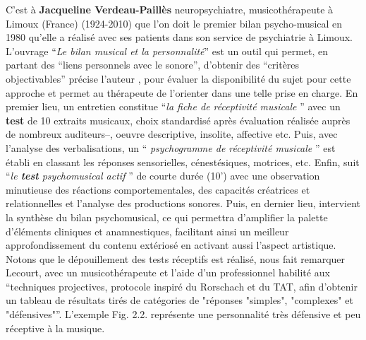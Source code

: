 C'est à \textbf{Jacqueline Verdeau-Paillès} neuropsychiatre,
  musicothérapeute à Limoux (France) (1924-2010) que l'on doit le premier bilan
                     psycho-musical en 1980 qu'elle a réalisé avec ses patients dans son service
                     de psychiatrie à Limoux.
L'ouvrage \enquote {\textit{Le bilan musical et la personnalité}}\autocite{verdeau-pailles:bilan}
                     est un outil qui permet, en partant des \enquote {liens personnels avec le sonore}, d'obtenir des \enquote {critères objectivables} précise l'auteur  \autocite[37]{vrait_musicotherapie_2018}, pour évaluer la disponibilité du sujet pour cette
                     approche et permet au thérapeute de l'orienter dans
                                 une telle prise en charge. En premier lieu, un entretien constitue \enquote {\textit{la fiche de réceptivité musicale} } avec un \textbf{test} de 10 extraits musicaux, choix standardisé après évaluation réalisée auprès de nombreux auditeurs--, oeuvre descriptive, insolite, affective etc.
Puis, avec l'analyse des verbalisations, un \enquote { \textit{psychogramme de réceptivité musicale} } est établi en classant les réponses sensorielles, cénestésiques, motrices, etc. Enfin, suit \enquote {\textit{le \textbf{test}  psychomusical actif} } \autocite{verdeau_expression} de courte durée (10') avec une observation minutieuse des réactions comportementales, des capacités créatrices et relationnelles et l'analyse des productions sonores. Puis, en  dernier lieu, intervient la synthèse du bilan psychomusical, ce qui permettra d'amplifier la palette d'éléments
                                cliniques et anamnestiques, facilitant ainsi un meilleur approfondissement du
                                 contenu extériosé en activant aussi l'aspect artistique.
Notons que le dépouillement des tests réceptifs est réalisé, nous fait remarquer Lecourt, avec un 
musicothérapeute et l'aide d'un professionnel habilité aux \enquote {techniques projectives, protocole 
inspiré du Rorschach et du TAT, afin d'obtenir un tableau de résultats tirés de catégories de "réponses 
"simples", "complexes" et "défensives"}\autocite[p.86] {lecourt_les_2017}. L'exemple Fig. 2.2. représente  
une personnalité très défensive et peu réceptive à la musique.
